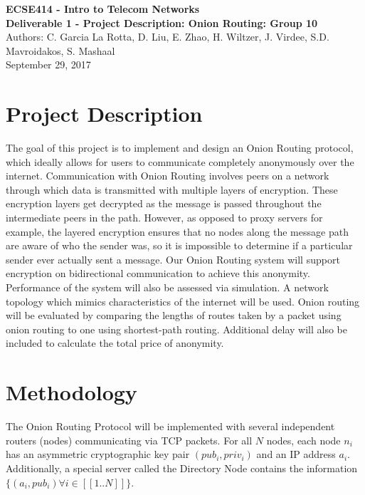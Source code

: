\documentclass[10pt]{article}
\begin{document}
\noindent
\large \textbf{ECSE414 - Intro to Telecom Networks\\Deliverable 1 - Project Description: Onion Routing: Group 10}\\
Authors: C. Garcia La Rotta, D. Liu, E. Zhao, H. Wiltzer, J. Virdee, S.D. Mavroidakos, S. Mashaal\\
September 29, 2017

\section*{Project Description}

The goal of this project is to implement and design an Onion Routing protocol,
which ideally allows for users to communicate completely anonymously over the
internet. Communication with Onion Routing involves peers on a network through which data is transmitted with multiple layers of encryption. These encryption layers get decrypted as
the message is passed throughout the intermediate peers in the path.
However, as opposed to proxy servers for example,
the layered encryption ensures that no nodes along the
message path are aware of who the sender was, so it is impossible to determine
if a particular sender ever actually sent a message. Our Onion Routing
system will support encryption on bidirectional communication to achieve this
anonymity.\\

\noindent Performance of the system will also be assessed via simulation. A network topology which mimics characteristics of the internet will be used. Onion routing will be evaluated by comparing the lengths of routes taken by a packet using onion routing to one using shortest-path routing. Additional delay will also be included to calculate the total price of anonymity.


\section*{Methodology}

The Onion Routing Protocol will be implemented with several independent routers (nodes)
communicating via TCP packets.  For all $N$ nodes, each node $n_i$ has
an asymmetric cryptographic key pair $(pub_{i},priv_{i})$ and an IP address $a_i$.  Additionally, a special
server called the Directory Node contains the information $\{(a_i, pub_i) \forall i \in [\![1..N]\!]\}$.\\
\end{document}

